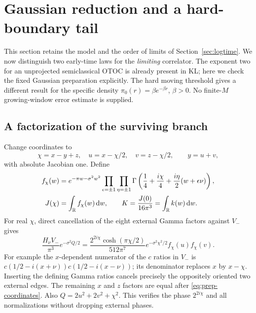 \section{Gaussian reduction and a hard-boundary tail}
\label{sec:preparation}
This section retains the model and the order of limits of
Section~\ref{sec:logtime}. We now distinguish two early-time laws for
the \emph{limiting} correlator. The exponent two for an unprojected
semiclassical OTOC is already present in KL; here we check the fixed
Gaussian preparation explicitly. The hard moving threshold gives a
different result for the specific density $\pi_0(r)=\beta e^{-\beta r}$,
$\beta>0$. No finite-$M$ growing-window error estimate is supplied.

\subsection{A factorization of the surviving branch}
Change coordinates to
\begin{equation}
 \chi=x-y+z,\quad u=x-\chi/2,\quad v=z-\chi/2,
 \qquad y=u+v,
 \label{eq:prep-coordinates}
\end{equation}
with absolute Jacobian one. Define
\begin{align}
 f_\chi(w)&=e^{-\pi w-\sigma^2w^2}
   \prod_{\epsilon=\pm1}\prod_{\eta=\pm1}
   \Gamma\left(\frac14+\frac{i\chi}{4}
                    +\frac{i\eta}{2}(w+\epsilon\nu)\right),\notag\\
 J(\chi)&=\int_{\mathbb R}f_\chi(w)\mathop{}\!\mathrm d w,\qquad
 K=\frac{J(0)}{16\pi^3}=\int_{\mathbb R}k(w)\mathop{}\!\mathrm d w.
 \label{eq:prep-f-J}
\end{align}
For real $\chi$, direct cancellation of the eight external Gamma
factors against $V_-$ gives
\begin{equation}
 \frac{H_\nu V_-}{\pi^3}e^{-\sigma^2Q/2}
 =\frac{2^{2i\chi}\cosh(\pi\chi/2)}{512\pi^7}
       e^{-\sigma^2\chi^2/2}f_\chi(u)f_\chi(v).
 \label{eq:prep-factorization}
\end{equation}
For example the $x$-dependent numerator of the $c$ ratios in $V_-$
is $c(1/2-i(x+\nu))c(1/2-i(x-\nu))$; its denominator replaces
$x$ by $x-\chi$. Inserting the defining Gamma ratios cancels precisely
the oppositely oriented two external edges. The remaining $x$ and $z$
factors are equal after \eqref{eq:prep-coordinates}. Also
$Q=2u^2+2v^2+\chi^2$. This verifies the phase $2^{2i\chi}$ and all
normalizations without dropping external phases.

